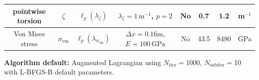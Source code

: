 \begin{table}[t]
{\begin{tabular}{|c|c|c|c|c|c|c|c|}
  pointwise torsion & $\zeta$ & $\ell_p(\lambda_\zeta)$ & $\lambda_\zeta=1\,\mathrm{m}^{-1}$, $p{=}2$ & No & 0.7 & 1.2 & m$^{-1}$ \\\hline
  Von Mises stress & $\sigma_{\mathrm{vm}}$ & $\ell_p(\lambda_{\sigma_{\mathrm{vm}}})$ & $\Delta x=0.16$m, $E{=}100\,\mathrm{GPa}$ & No & 43.5 & 8480 & GPa \\\hline
\end{tabular}%
}
\par\vspace{0.3em}
\footnotesize
\textbf{Algorithm default:} Augmented Lagrangian using $N_\text{iter}=$1000, $N_\text{subiter}=$10 with L-BFGS-B default parameters.
\end{table}
